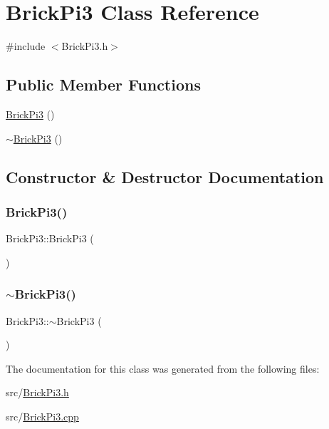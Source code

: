 \hypertarget{class_brick_pi3}{}\section{Brick\+Pi3 Class Reference}
\label{class_brick_pi3}


{\ttfamily \#include $<$Brick\+Pi3.\+h$>$}

\subsection*{Public Member Functions}
\begin{DoxyCompactItemize}
\item 
\mbox{\hyperlink{class_brick_pi3_abd966c52f01fcc176bf613bd993ea793}{Brick\+Pi3}} ()
\item 
\mbox{\hyperlink{class_brick_pi3_a94cb50dd4a9099ad9abf90d43977f3b9}{$\sim$\+Brick\+Pi3}} ()
\end{DoxyCompactItemize}


\subsection{Constructor \& Destructor Documentation}
\mbox{\label{class_brick_pi3_abd966c52f01fcc176bf613bd993ea793}} 
\subsubsection{\texorpdfstring{Brick\+Pi3()}{BrickPi3()}}
{\footnotesize\ttfamily Brick\+Pi3\+::\+Brick\+Pi3 (\begin{DoxyParamCaption}{ }\end{DoxyParamCaption})}

\mbox{\label{class_brick_pi3_a94cb50dd4a9099ad9abf90d43977f3b9}} 
\subsubsection{\texorpdfstring{$\sim$\+Brick\+Pi3()}{~BrickPi3()}}
{\footnotesize\ttfamily Brick\+Pi3\+::$\sim$\+Brick\+Pi3 (\begin{DoxyParamCaption}{ }\end{DoxyParamCaption})}



The documentation for this class was generated from the following files\+:\begin{DoxyCompactItemize}
\item 
src/\mbox{\hyperlink{_brick_pi3_8h}{Brick\+Pi3.\+h}}\item 
src/\mbox{\hyperlink{_brick_pi3_8cpp}{Brick\+Pi3.\+cpp}}\end{DoxyCompactItemize}

